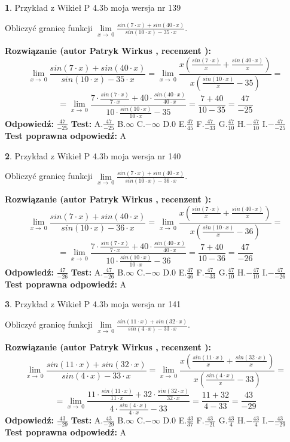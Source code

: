 \documentclass[12pt, a4paper]{article}
\theoremstyle{definition} %
\newtheorem{zad}{}
\newcommand{\zadStart}[1]{\begin{zad}#1\newline}
\newcommand{\zadStop}{\end{zad}}
\newcommand{\rozwStart}[2]{\noindent \textbf{Rozwiązanie (autor #1 , recenzent #2): }\newline}
\newcommand{\rozwStop}{\newline}
\newcommand{\odpStart}{\noindent \textbf{Odpowiedź:}\newline}
\newcommand{\odpStop}{\newline}
\newcommand{\testStart}{\noindent \textbf{Test:}\newline}
\newcommand{\testStop}{\newline}
\newcommand{\kluczStart}{\noindent \textbf{Test poprawna odpowiedź:}\newline}
\newcommand{\kluczStop}{\newline}
\begin{document}
\zadStart{Przykład z Wikieł P 4.3b moja wersja nr 139}


Obliczyć granicę funkcji $\lim\limits_{x\to\ 0}\frac{sin(7 \cdot x)+sin(40 \cdot x)}{sin(10 \cdot x)-35 \cdot x}$.
\zadStop
\rozwStart{Patryk Wirkus}{}
$$\lim\limits_{x\to\ 0}\frac{sin(7 \cdot x)+sin(40 \cdot x)}{sin(10 \cdot x)-35 \cdot x}=\lim\limits_{x\to\ 0}\frac{x(\frac{sin(7 \cdot x)}{x}+\frac{sin(40 \cdot x)}{x})}{x(\frac{sin(10 \cdot x)}{x}-35)}=$$
$$=\lim\limits_{x\to\ 0}\frac{7 \cdot \frac{sin(7 \cdot x)}{7 \cdot x}+40 \cdot \frac{sin(40 \cdot x)}{40 \cdot x}}{10 \cdot \frac{sin(10 \cdot x)}{10 \cdot x}-35}=\frac{7+40}{10-35} = \frac{47}{-25}$$
\rozwStop
\odpStart
$\frac{47}{-25}$
\odpStop
\testStart
A.$\frac{47}{-25}$
B.$\infty$
C.$-\infty$
D.$0$
E.$\frac{47}{45}$
F.$\frac{47}{-33}$
G.$\frac{47}{10}$
H.$-\frac{47}{10}$
I.$-\frac{47}{-25}$
\testStop
\kluczStart
A
\kluczStop



\zadStart{Przykład z Wikieł P 4.3b moja wersja nr 140}


Obliczyć granicę funkcji $\lim\limits_{x\to\ 0}\frac{sin(7 \cdot x)+sin(40 \cdot x)}{sin(10 \cdot x)-36 \cdot x}$.
\zadStop
\rozwStart{Patryk Wirkus}{}
$$\lim\limits_{x\to\ 0}\frac{sin(7 \cdot x)+sin(40 \cdot x)}{sin(10 \cdot x)-36 \cdot x}=\lim\limits_{x\to\ 0}\frac{x(\frac{sin(7 \cdot x)}{x}+\frac{sin(40 \cdot x)}{x})}{x(\frac{sin(10 \cdot x)}{x}-36)}=$$
$$=\lim\limits_{x\to\ 0}\frac{7 \cdot \frac{sin(7 \cdot x)}{7 \cdot x}+40 \cdot \frac{sin(40 \cdot x)}{40 \cdot x}}{10 \cdot \frac{sin(10 \cdot x)}{10 \cdot x}-36}=\frac{7+40}{10-36} = \frac{47}{-26}$$
\rozwStop
\odpStart
$\frac{47}{-26}$
\odpStop
\testStart
A.$\frac{47}{-26}$
B.$\infty$
C.$-\infty$
D.$0$
E.$\frac{47}{46}$
F.$\frac{47}{-33}$
G.$\frac{47}{10}$
H.$-\frac{47}{10}$
I.$-\frac{47}{-26}$
\testStop
\kluczStart
A
\kluczStop



\zadStart{Przykład z Wikieł P 4.3b moja wersja nr 141}


Obliczyć granicę funkcji $\lim\limits_{x\to\ 0}\frac{sin(11 \cdot x)+sin(32 \cdot x)}{sin(4 \cdot x)-33 \cdot x}$.
\zadStop
\rozwStart{Patryk Wirkus}{}
$$\lim\limits_{x\to\ 0}\frac{sin(11 \cdot x)+sin(32 \cdot x)}{sin(4 \cdot x)-33 \cdot x}=\lim\limits_{x\to\ 0}\frac{x(\frac{sin(11 \cdot x)}{x}+\frac{sin(32 \cdot x)}{x})}{x(\frac{sin(4 \cdot x)}{x}-33)}=$$
$$=\lim\limits_{x\to\ 0}\frac{11 \cdot \frac{sin(11 \cdot x)}{11 \cdot x}+32 \cdot \frac{sin(32 \cdot x)}{32 \cdot x}}{4 \cdot \frac{sin(4 \cdot x)}{4 \cdot x}-33}=\frac{11+32}{4-33} = \frac{43}{-29}$$
\rozwStop
\odpStart
$\frac{43}{-29}$
\odpStop
\testStart
A.$\frac{43}{-29}$
B.$\infty$
C.$-\infty$
D.$0$
E.$\frac{43}{37}$
F.$\frac{43}{-21}$
G.$\frac{43}{4}$
H.$-\frac{43}{4}$
I.$-\frac{43}{-29}$
\testStop
\kluczStart
A
\kluczStop
\end{document}
